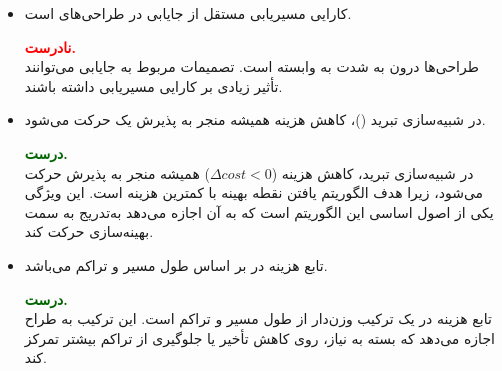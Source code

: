 \begin{itemize}
	
	
	\item کارایی مسیریابی مستقل از جایابی در طراحی‌های  است.
	\begin{qsolve}
		\textbf{\textcolor{red}{نادرست.}}\\
		طراحی‌ها درون  به شدت به  وابسته است. تصمیمات مربوط به جایابی می‌توانند تأثیر زیادی بر کارایی مسیریابی داشته باشند.
	\end{qsolve}
	
	
	\item در شبیه‌سازی تبرید ()، کاهش هزینه همیشه منجر به پذیرش یک حرکت می‌شود.
	\begin{qsolve}
		\textbf{\textcolor{darkgreen}{درست.}}\\
		در شبیه‌سازی تبرید، کاهش هزینه ($\Delta cost < 0$) همیشه منجر به پذیرش حرکت می‌شود، زیرا هدف الگوریتم یافتن نقطه بهینه با کمترین هزینه است. این ویژگی یکی از اصول اساسی این الگوریتم است که به آن اجازه می‌دهد به‌تدریج به سمت بهینه‌سازی حرکت کند.
	\end{qsolve}
	
	
	\item تابع هزینه در  بر اساس طول مسیر و تراکم می‌باشد.
	\begin{qsolve}
		\textbf{\textcolor{darkgreen}{درست.}}\\
		تابع هزینه در  یک ترکیب وزن‌دار از طول مسیر و تراکم است. این ترکیب به طراح اجازه می‌دهد که بسته به نیاز، روی کاهش تأخیر یا جلوگیری از تراکم بیشتر تمرکز کند.
	\end{qsolve}
	
\end{itemize}












